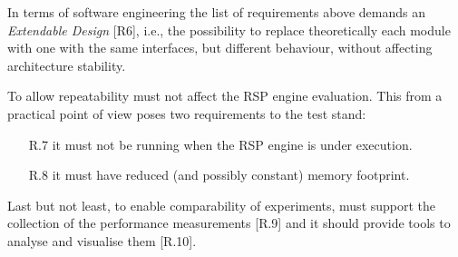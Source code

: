 In terms of software engineering the list of requirements above demands an \textit{Extendable Design} [R6], i.e.,  the possibility to replace theoretically each module with one with the same interfaces, but different behaviour, without affecting architecture stability. %

To allow repeatability \name must not affect the RSP engine evaluation. This from a practical point of view poses two requirements to the test stand:
\begin{enumerate}
\item[R.7] it must not be running when the RSP engine is under execution. %
\item[R.8] it must have reduced (and possibly constant) memory footprint. %
\end{enumerate}




Last but not least, to enable comparability of experiments, \name must support the collection of the performance measurements [R.9] and it should provide tools to analyse and visualise them [R.10].%
